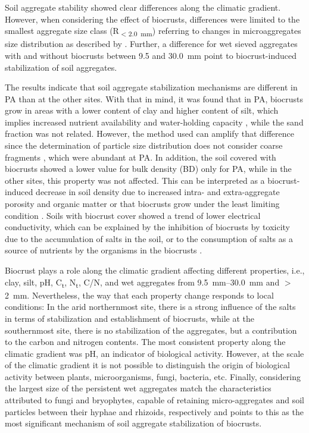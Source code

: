 Soil aggregate stability showed clear differences along the climatic gradient. However, when considering the effect of biocrusts, differences were limited to the smallest aggregate size class (R\textsubscript{$<$\SI{2.0}{\milli\meter}}) referring to changes in microaggregates size distribution as described by \citet{Totsche2018}. Further, a difference for wet sieved aggregates with and without biocrusts between 9.5 and \SI{30.0}{\milli\meter} point to biocrust-induced stabilization of soil aggregates.

The results indicate that soil aggregate stabilization mechanisms are different in PA than at the other sites. With that in mind, it was found that in PA, biocrusts grow in areas with a lower content of clay and higher content of silt, which implies increased nutrient availability and water-holding capacity \citep{Chen2020}, while the sand fraction was not related. However, the method used can amplify that difference since the determination of particle size distribution does not consider coarse fragments \citep{Kohn1929}, which were abundant at PA. In addition, the soil covered with biocrusts showed a lower value for bulk density (BD) only for PA, while in the other sites, this property was not affected. This can be interpreted as a biocrust-induced decrease in soil density due to increased intra- and extra-aggregate porosity and organic matter \citep{Whitney2017} or that biocrusts grow under the least limiting condition \citep{Bowker2014}. Soils with biocrust cover showed a trend of lower electrical conductivity, which can be explained by the inhibition of biocrusts by toxicity due to the accumulation of salts in the soil, or to the consumption of salts as a source of nutrients by the organisms in the biocrusts \citep{Abed2019}.

Biocrust plays a role along the climatic gradient affecting different properties, i.e., clay, silt, pH, C\textsubscript{t}, N\textsubscript{t}, C/N, and wet aggregates from \SIrange[range-units=single]{9.5}{30.0}{\milli\meter} and $>$\SI{2}{\milli\meter}. Nevertheless, the way that each property change responds to local conditions: In the arid northernmost site, there is a strong influence of the salts in terms of stabilization and establishment of biocrusts, while at the southernmost site, there is no stabilization of the aggregates, but a contribution to the carbon and nitrogen contents. The most consistent property along the climatic gradient was pH, an indicator of biological activity. However, at the scale of the climatic gradient it is not possible to distinguish the origin of biological activity between plants, microorganisms, fungi, bacteria, etc. Finally, considering the largest size of the persistent wet aggregates match the characteristics attributed to fungi and bryophytes, capable of retaining micro-aggregates and soil particles between their hyphae and rhizoids, respectively \citep{Kleber2007,Six2004,Totsche2018} and points to this as the most significant mechanism of soil aggregate stabilization of biocrusts.


